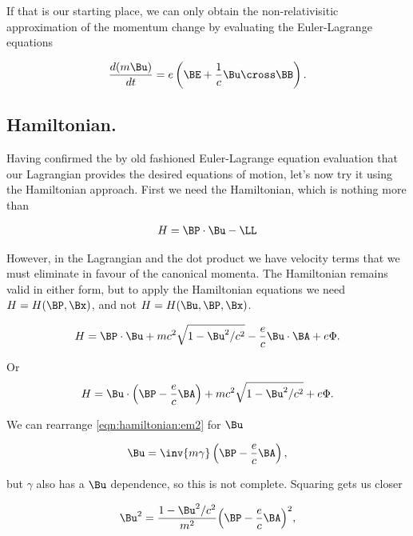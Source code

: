 If that is our starting place, we can only obtain the non-relativisitic approximation of the momentum change by evaluating the Euler-Lagrange equations

\begin{align}\label{eqn:hamiltonian:em5a}
\frac{d (m \Bu)}{dt} = e \left( \BE + \frac{1}{c} \Bu \cross \BB \right).
\end{align}

\subsection{Hamiltonian.}

Having confirmed the by old fashioned Euler-Lagrange equation evaluation that our Lagrangian provides the desired equations of motion, let's now try it using the Hamiltonian approach.  First we need the Hamiltonian, which is nothing more than

\begin{align}\label{eqn:hamiltonian:em10}
H = \BP \cdot \Bu - \LL
\end{align}

However, in the Lagrangian and the dot product we have velocity terms that we must eliminate in favour of the canonical momenta.  The Hamiltonian remains valid in either form, but to apply the Hamiltonian equations we need $H = H(\BP, \Bx)$, and not $H = H(\Bu, \BP, \Bx)$.

\begin{align}\label{eqn:hamiltonian:em11}
H = \BP \cdot \Bu + m c^2 \sqrt{1 - \Bu^2/c^2} - \frac{e}{c} \Bu \cdot \BA + e \Phi.
\end{align}

Or
\begin{align}\label{eqn:hamiltonian:em11b}
H = \Bu \cdot \left(\BP - \frac{e}{c} \BA\right) + m c^2 \sqrt{1 - \Bu^2/c^2} + e \Phi.
\end{align}

We can rearrange \ref{eqn:hamiltonian:em2} for $\Bu$

\begin{align}\label{eqn:hamiltonian:em12}
\Bu = \inv{m \gamma} \left( \BP - \frac{e}{c} \BA \right),
\end{align}

but $\gamma$ also has a $\Bu$ dependence, so this is not complete.  Squaring gets us closer

\begin{align}\label{eqn:hamiltonian:em13}
\Bu^2 = \frac{1 - \Bu^2/c^2}{m^2} {\left( \BP - \frac{e}{c} \BA \right)}^2,
\end{align}

